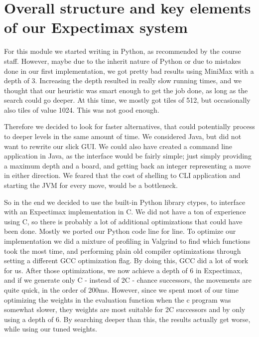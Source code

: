 \section{Overall structure and key elements of our Expectimax system}
For this module we started writing in Python, as recommended by the course
staff. However, maybe due to the inherit nature of Python or due to mistakes
done in our first implementation, we got pretty bad results using MiniMax with a depth of 3.
Increasing the depth resulted in really slow running times, and we thought that our heuristic was smart enough to get the job done, as long as the search could go deeper. At this time, we mostly got tiles of 512, but occasionally also tiles of value 1024. This was not good enough.

Therefore we decided to look for faster alternatives, that could potentially process to deeper levels in the same amount of time. We considered Java, but did not want to rewrite our slick GUI. We could also have created a command line application in
Java, as the interface would be fairly simple; just simply providing a maximum depth
and a board, and getting back an integer representing a move in either direction. We feared that the
cost of shelling to CLI application and starting the JVM for every move, would
be a bottleneck.

So in the end we decided to use the built-in Python library ctypes, to interface
with an Expectimax implementation in C. We did not have a ton of experience using
C, so there is probably a lot of additional optimizations that could have been done. Mostly we
ported our Python code line for line. To optimize our implementation we did a mixture of profiling in Valgrind to find
which functions took the most time, and performing plain old compiler optimizations through setting a different GCC optimization flag. By doing this, GCC did a lot of work for us. After those optimizations, we now achieve a depth of 6
in Expectimax, and if we generate only C - instead of 2C - chance successors, the
movements are quite quick, in the order of 200ms. However, since we spent most
of our time optimizing the weights in the evaluation function when the c program
was somewhat slower, they weights are most suitable for 2C successors and by only using a depth of 6.
By searching deeper than this, the results actually get worse, while using our tuned weights.


